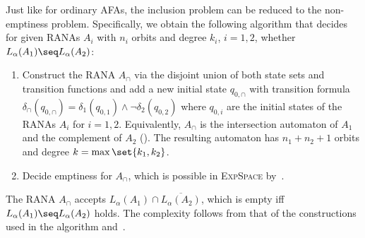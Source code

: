 \documentclass[10pt, final, conference, a4paper, twocolumn]{IEEEtran}
\newcommand{\EXPSPACE}{\textsc{ExpSpace}\xspace}
\begin{document}
\begin{IEEEproof}

Just like for ordinary AFAs, the inclusion problem can be reduced to the non-emptiness problem. Specifically, we obtain the following algorithm that decides for given RANAs $A_i$ with $n_i$ orbits and degree $k_i$, $i = 1,2$, whether {$L_\alpha(A_1) \seq L_\alpha(A_2)$}:
  \begin{enumerate}
    \item Construct the RANA $A_{\cap}$ via the disjoint union of both state sets and
      transition functions and add a new initial state $q_{0,\cap}$ with transition formula
      $\delta_{\cap}(q_{0,\cap}) = \delta_1(q_{0,1}) \wedge \neg\delta_2(q_{0,2})$ where
      $q_{0,i}$ are the initial states of the RANAs $A_i$ for $i = 1,2$. Equivalently, $A_{\cap}$ is the intersection automaton of $A_1$ and the complement of $A_2$ ().
      The resulting automaton has $n_1 + n_2 + 1$ orbits and degree $k = \max\set{k_1,k_2}$.
    \item Decide emptiness for $A_{\cap}$, which is possible in
      \EXPSPACE by~.
  \end{enumerate}

The RANA $A_\cap$ accepts $L_{\alpha}(A_1) \cap \overline{L_{\alpha}(A_2)}$, which is empty iff $L_{\alpha}(A_1) \seq L_{\alpha}(A_2)$ holds. The complexity follows from that of the constructions used in the algorithm and~.
\end{IEEEproof}
\endgroup
\end{document}
